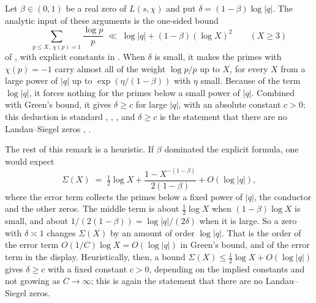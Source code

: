 \begin{remark}\label{rem:strength}
Let $\beta \in (0,1)$ be a real zero of $L(s,\chi)$ and put $\delta = (1-\beta)\log |q|$. The analytic input of these arguments is the one-sided bound
\[
  \sum_{p\le X,\ \chi(p)=1} \frac{\log p}{p} \;\ll\; \log |q| + (1-\beta)(\log X)^2 \qquad (X \ge 3)
\]
of \cite[Lemma~1]{Kerr2026}, with explicit constants in \cite[Lemma~2.1]{Banks2026}. When $\delta$ is small, it makes the primes with $\chi(p) = -1$ carry almost all of the weight $\log p/p$ up to $X$, for every $X$ from a large power of $|q|$ up to $\exp(\eta/(1-\beta))$ with $\eta$ small. Because of the term $\log|q|$, it forces nothing for the primes below a small power of $|q|$. Combined with Green's bound, it gives $\delta \ge c$ for large $|q|$, with an absolute constant $c > 0$; this deduction is standard \cite[\S1]{Green2026}, \cite{OAIsiegel}, \cite[\S1.3]{Banks2026}, and $\delta \ge c$ is the statement that there are no Landau--Siegel zeros \cite[Theorem~1]{Kerr2026}, \cite[Theorem~1.1]{Banks2026}.

The rest of this remark is a heuristic. If $\beta$ dominated the explicit formula, one would expect
\[
  \Sigma(X) \;=\; \tfrac12\log X + \frac{1 - X^{-(1-\beta)}}{2(1-\beta)} + O(\log |q|),
\]
where the error term collects the primes below a fixed power of $|q|$, the conductor and the other zeros. The middle term is about $\tfrac12\log X$ when $(1-\beta)\log X$ is small, and about $1/(2(1-\beta)) = \log |q|/(2\delta)$ when it is large. So a zero with $\delta \asymp 1$ changes $\Sigma(X)$ by an amount of order $\log |q|$. That is the order of the error term $O(1/C)\log X = O(\log |q|)$ in Green's bound, and of the error term in the display. Heuristically, then, a bound $\Sigma(X) \le \tfrac12\log X + O(\log |q|)$ gives $\delta \ge c$ with a fixed constant $c > 0$, depending on the implied constants and not growing as $C \to \infty$; this is again the statement that there are no Landau--Siegel zeros.
\end{remark}

